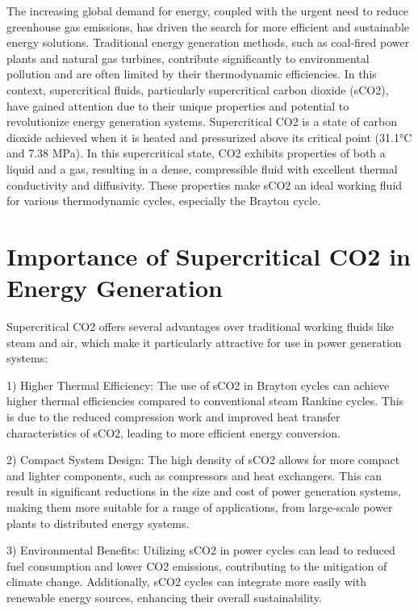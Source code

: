 
The increasing global demand for energy, coupled with the urgent need to reduce greenhouse gas emissions, has driven the search for more efficient and sustainable energy solutions. 
Traditional energy generation methods, such as coal-fired power plants and natural gas turbines, contribute significantly to environmental pollution and are often limited by their 
thermodynamic efficiencies. In this context, supercritical fluids, particularly supercritical carbon dioxide (sCO2), have gained attention due to their unique properties and 
potential to revolutionize energy generation systems.
Supercritical CO2 is a state of carbon dioxide achieved when it is heated and pressurized above its critical point (31.1°C and 7.38 MPa). 
In this supercritical state, CO2 exhibits properties of both a liquid and a gas, resulting in a dense, compressible fluid with excellent thermal conductivity and diffusivity. 
These properties make sCO2 an ideal working fluid for various thermodynamic cycles, especially the Brayton cycle.

\section*{Importance of Supercritical CO2 in Energy Generation}

Supercritical CO2 offers several advantages over traditional working fluids like steam and air, which make it particularly attractive for use in power generation systems:

1) Higher Thermal Efficiency: The use of sCO2 in Brayton cycles can achieve higher thermal efficiencies compared to conventional steam Rankine cycles. This is due to the reduced compression work and improved heat transfer characteristics of sCO2, leading to more efficient energy conversion.

2) Compact System Design: The high density of sCO2 allows for more compact and lighter components, such as compressors and heat exchangers. This can result in significant reductions in the size and cost of power generation systems, making them more suitable for a range of applications, from large-scale power plants to distributed energy systems.

3) Environmental Benefits: Utilizing sCO2 in power cycles can lead to reduced fuel consumption and lower CO2 emissions, contributing to the mitigation of climate change. Additionally, sCO2 cycles can integrate more easily with renewable energy sources, enhancing their overall sustainability.

